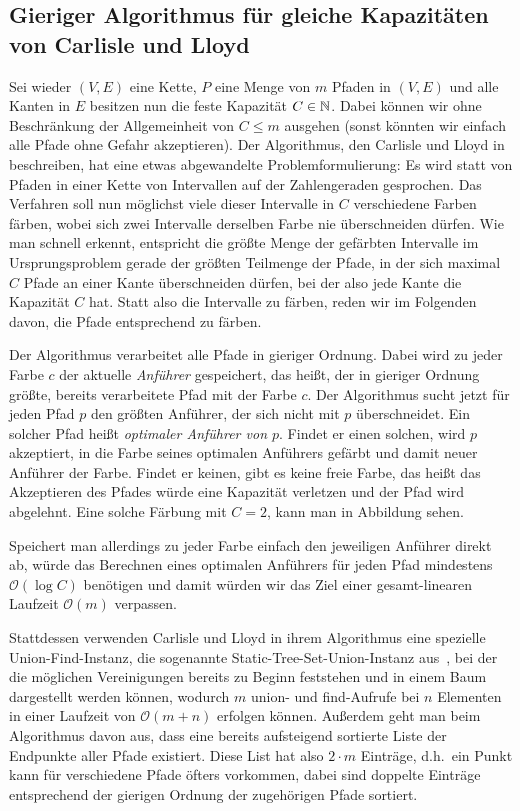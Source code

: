 \subsection{Gieriger Algorithmus für gleiche Kapazitäten von Carlisle und Lloyd}\label{subsec:algorithmusGleicheKapazitäten}
Sei wieder $(V,E)$ eine Kette, $P$ eine Menge von $m$ Pfaden in $(V,E)$ und alle Kanten in $E$ besitzen nun die
feste Kapazität $C \in \mathbb N$.
Dabei können wir ohne Beschränkung der Allgemeinheit von $C \leq m$ ausgehen (sonst könnten wir einfach alle Pfade ohne Gefahr
akzeptieren).
Der Algorithmus, den Carlisle und Lloyd in~\cite{carlisle} beschreiben, hat eine etwas abgewandelte Problemformulierung:
Es wird statt von Pfaden in einer Kette von Intervallen auf der Zahlengeraden gesprochen.
Das Verfahren soll nun möglichst viele dieser Intervalle in $C$ verschiedene Farben färben, wobei sich zwei Intervalle derselben
Farbe nie überschneiden dürfen.
Wie man schnell erkennt, entspricht die größte Menge der gefärbten Intervalle im Ursprungsproblem gerade der größten Teilmenge der Pfade,
in der sich maximal $C$ Pfade an einer Kante überschneiden dürfen, bei der also jede Kante die Kapazität $C$ hat.
Statt also die Intervalle zu färben, reden wir im Folgenden davon, die Pfade entsprechend zu färben.

Der Algorithmus verarbeitet alle Pfade in gieriger Ordnung.
Dabei wird zu jeder Farbe $c$ der aktuelle {\em Anführer} gespeichert, das heißt, der in gieriger Ordnung größte, bereits
verarbeitete Pfad mit der Farbe $c$.
Der Algorithmus sucht jetzt für jeden Pfad $p$ den größten Anführer, der sich nicht mit $p$ überschneidet.
Ein solcher Pfad heißt {\em optimaler Anführer von $p$}.
Findet er einen solchen, wird $p$ akzeptiert, in die Farbe seines optimalen Anführers gefärbt und damit neuer Anführer
der Farbe.
Findet er keinen, gibt es keine freie Farbe, das heißt das Akzeptieren des Pfades würde eine Kapazität verletzen und der
Pfad wird abgelehnt.
Eine solche Färbung mit $C = 2$, kann man in Abbildung  sehen.


Speichert man allerdings zu jeder Farbe einfach den jeweiligen Anführer direkt ab, würde das Berechnen eines optimalen
Anführers für jeden Pfad mindestens $\mathcal O(\log C)$ benötigen und damit würden wir das Ziel einer gesamt-linearen Laufzeit
$\mathcal O(m)$ verpassen.

Stattdessen verwenden Carlisle und Lloyd in ihrem Algorithmus eine spezielle Union-Find-Instanz, die sogenannte
Static-Tree-Set-Union-Instanz aus~\cite{static-tree-set-union}, bei der die möglichen Vereinigungen bereits zu Beginn feststehen und in einem Baum
dargestellt werden können, wodurch $m$ union- und find-Aufrufe bei $n$ Elementen in einer Laufzeit von $\mathcal O(m + n)$ erfolgen können.
Außerdem geht man beim Algorithmus davon aus, dass eine bereits aufsteigend sortierte Liste der Endpunkte aller Pfade existiert.
Diese List hat also $2\cdot m$ Einträge, d.h.\ ein Punkt kann für verschiedene Pfade öfters vorkommen, dabei sind doppelte Einträge entsprechend der gierigen
Ordnung der zugehörigen Pfade sortiert.

